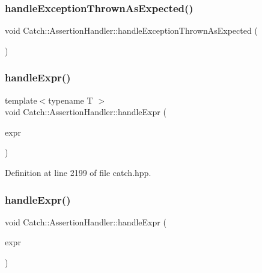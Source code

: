 \subsubsection{handleExceptionThrownAsExpected()}
{\footnotesize\ttfamily void Catch\+::\+Assertion\+Handler\+::handle\+Exception\+Thrown\+As\+Expected (\begin{DoxyParamCaption}{ }\end{DoxyParamCaption})}

\mbox{\label{class_catch_1_1_assertion_handler_a2ef387e567bad90ec6e4b5bf5c367388}} 
\subsubsection{handleExpr()\hspace{0.1cm}{\footnotesize\ttfamily [1/2]}}
{\footnotesize\ttfamily template$<$typename T $>$ \\
void Catch\+::\+Assertion\+Handler\+::handle\+Expr (\begin{DoxyParamCaption}\item[{\textbf{ Expr\+Lhs}$<$ T $>$ const \&}]{expr }\end{DoxyParamCaption})\hspace{0.3cm}{\ttfamily [inline]}}



Definition at line 2199 of file catch.\+hpp.

\mbox{\label{class_catch_1_1_assertion_handler_afe14d9cf1b1c7f70dae439fbdb51d0c4}} 
\subsubsection{handleExpr()\hspace{0.1cm}{\footnotesize\ttfamily [2/2]}}
{\footnotesize\ttfamily void Catch\+::\+Assertion\+Handler\+::handle\+Expr (\begin{DoxyParamCaption}\item[{\textbf{ I\+Transient\+Expression} const \&}]{expr }\end{DoxyParamCaption})}

\mbox{\label{class_catch_1_1_assertion_handler_abdb4c180ed83ec2858b2fb87712c516d}} 
